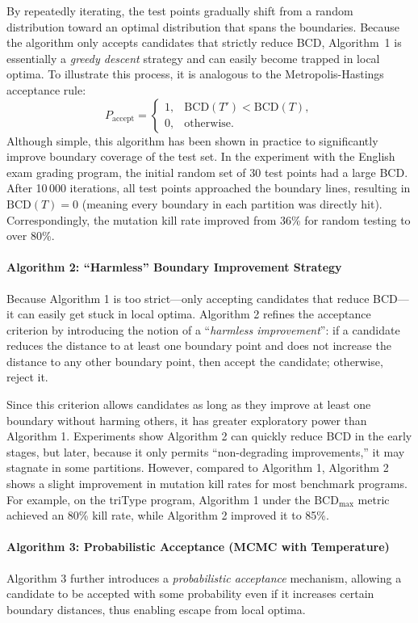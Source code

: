 \documentclass[manuscript,screen,review]{acmart}
\begin{document}
By repeatedly iterating, the test points gradually shift from a random distribution toward an optimal distribution that spans the boundaries. Because the algorithm only accepts candidates that strictly reduce BCD, Algorithm~1 is essentially a \emph{greedy descent} strategy and can easily become trapped in local optima. To illustrate this process, it is analogous to the Metropolis-Hastings acceptance rule:
\[
P_{\mathrm{accept}} =
\begin{cases}
1, & \mathrm{BCD}(T') < \mathrm{BCD}(T), \\
0, & \text{otherwise}.
\end{cases}
\]
Although simple, this algorithm has been shown in practice to significantly improve boundary coverage of the test set. In the experiment with the English exam grading program, the initial random set of 30 test points had a large BCD. After 10\,000 iterations, all test points approached the boundary lines, resulting in $\mathrm{BCD}(T) = 0$ (meaning every boundary in each partition was directly hit). Correspondingly, the mutation kill rate improved from 36\% for random testing to over 80\%.

\paragraph{Algorithm 2: ``Harmless'' Boundary Improvement Strategy}  
Because Algorithm 1 is too strict---only accepting candidates that reduce BCD---it can easily get stuck in local optima. Algorithm 2 refines the acceptance criterion by introducing the notion of a ``\emph{harmless improvement}'': if a candidate reduces the distance to at least one boundary point and does not increase the distance to any other boundary point, then accept the candidate; otherwise, reject it. 

Since this criterion allows candidates as long as they improve at least one boundary without harming others, it has greater exploratory power than Algorithm 1. Experiments show Algorithm 2 can quickly reduce BCD in the early stages, but later, because it only permits ``non-degrading improvements,'' it may stagnate in some partitions. However, compared to Algorithm 1, Algorithm 2 shows a slight improvement in mutation kill rates for most benchmark programs. For example, on the triType program, Algorithm 1 under the BCD$_{\max}$ metric achieved an 80\% kill rate, while Algorithm 2 improved it to 85\%.

\paragraph{Algorithm 3: Probabilistic Acceptance (MCMC with Temperature)}  
Algorithm 3 further introduces a \emph{probabilistic acceptance} mechanism, allowing a candidate to be accepted with some probability even if it increases certain boundary distances, thus enabling escape from local optima. 
\end{document}
